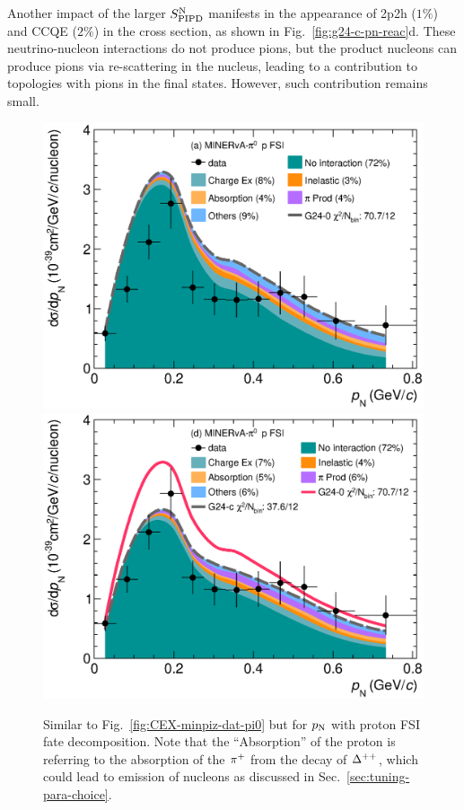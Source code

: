 Another impact of the larger $S_\textrm{PIPD}^\textrm{N}$ manifests in the appearance of 2p2h ($1\%$) and CCQE ($2 \%$) in the \minpiz cross section, as shown in Fig.~\ref{fig:g24-c-pn-reac}d. These neutrino-nucleon interactions do not produce pions, but the product nucleons can produce pions via re-scattering in the nucleus, leading to a contribution to topologies with pions in the final states. However, such contribution remains small.

\begin{figure}[!htb] 	
    \centering 		
    \includegraphics[width=\dbfigwid\textwidth]{figures/tuning/0000-min_pi0_pn_pr_decomp_cex.eps}
    \includegraphics[width=\dbfigwid\textwidth]{figures/tuning/0026-min_pi0_pn_pr_decomp_covfix.eps}	
    \caption{\label{fig:minpiz-pn-pr} Similar to Fig.~\ref{fig:CEX-minpiz-dat-pi0} but for $p_\textrm{N}$ with proton FSI fate decomposition. Note that the ``Absorption'' of the proton is referring to the absorption of the $\pi^+$ from the decay of $\Delta^{++}$, which could lead to emission of nucleons as discussed in Sec.~\ref{sec:tuning-para-choice}.     
    } 
\end{figure}

